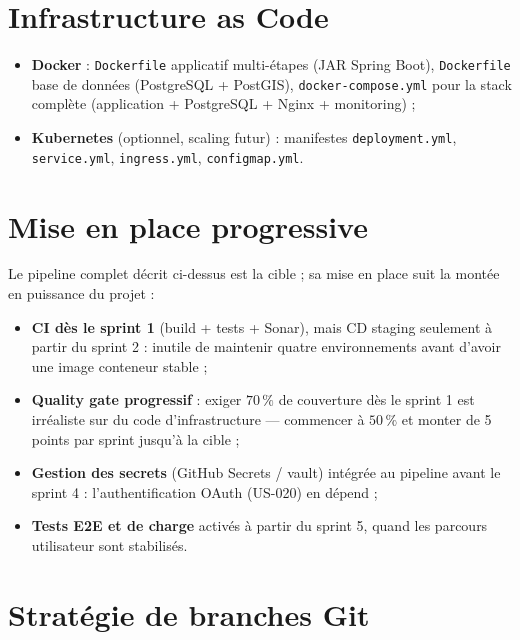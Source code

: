 \section{Infrastructure as Code}

\begin{itemize}
  \item \textbf{Docker} : \texttt{Dockerfile} applicatif multi-étapes (JAR Spring Boot),
        \texttt{Dockerfile} base de données (PostgreSQL + PostGIS),
        \texttt{docker-compose.yml} pour la stack complète
        (application + PostgreSQL + Nginx + monitoring) ;
  \item \textbf{Kubernetes} (optionnel, scaling futur) : manifestes
        \texttt{deployment.yml}, \texttt{service.yml}, \texttt{ingress.yml},
        \texttt{configmap.yml}.
\end{itemize}

\section{Mise en place progressive}

Le pipeline complet décrit ci-dessus est la cible ; sa mise en place suit
la montée en puissance du projet :

\begin{itemize}
  \item \textbf{CI dès le sprint 1} (build + tests + Sonar), mais CD staging
        seulement à partir du sprint 2 : inutile de maintenir quatre
        environnements avant d'avoir une image conteneur stable ;
  \item \textbf{Quality gate progressif} : exiger $70\,\%$ de couverture dès
        le sprint 1 est irréaliste sur du code d'infrastructure --- commencer
        à $50\,\%$ et monter de 5 points par sprint jusqu'à la cible ;
  \item \textbf{Gestion des secrets} (GitHub Secrets / vault) intégrée au
        pipeline avant le sprint 4 : l'authentification OAuth (US-020) en
        dépend ;
  \item \textbf{Tests E2E et de charge} activés à partir du sprint 5, quand
        les parcours utilisateur sont stabilisés.
\end{itemize}

\section{Stratégie de branches Git}

